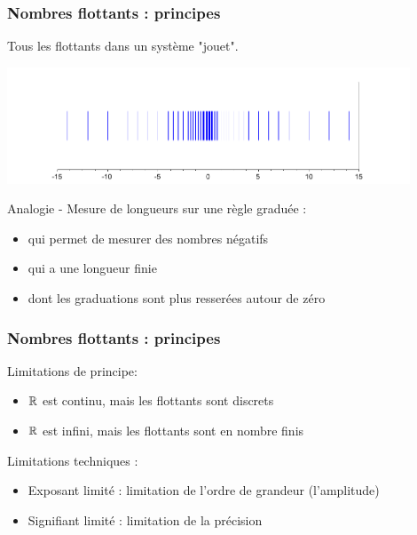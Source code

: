 \documentclass{beamer}
\begin{document}

\begin{frame}
\frametitle{Nombres flottants : principes}

Tous les flottants dans un système "jouet".

\begin{center}
\includegraphics[width=0.9\textwidth]{toysystem_all}
\end{center}

Analogie - Mesure de longueurs sur une règle graduée :
\begin{itemize}
\item qui permet de mesurer des nombres négatifs
\item qui a une longueur finie
\item dont les graduations sont plus resserées autour de zéro
\end{itemize}

\end{frame}


\begin{frame}
\frametitle{Nombres flottants : principes}

Limitations de principe:
\begin{itemize}
\item $\mathbb{R}$ est continu, mais les flottants sont discrets
\item $\mathbb{R}$ est infini, mais les flottants sont en nombre finis
\end{itemize}

Limitations techniques :
\begin{itemize}
\item Exposant limité : limitation de l'ordre de grandeur (l'amplitude)
\item Signifiant limité : limitation de la précision
\end{itemize}

\end{frame}

\end{document}
